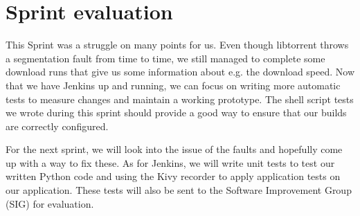 	\section{Sprint evaluation}
		This Sprint was a struggle on many points for us. Even though libtorrent throws a segmentation fault from time to time, we still managed to complete some download runs that give us some information about e.g. the download speed. Now that we have Jenkins up and running, we can focus on writing more automatic tests to measure changes and maintain a working prototype. The shell script tests we wrote during this sprint should provide a good way to ensure that our builds are correctly configured.
		
		For the next sprint, we will look into the issue of the faults and hopefully come up with a way to fix these. As for Jenkins, we will write unit tests to test our written Python code and using the Kivy recorder to apply application tests on our application. These tests will also be sent to the Software Improvement Group (SIG) for evaluation.
